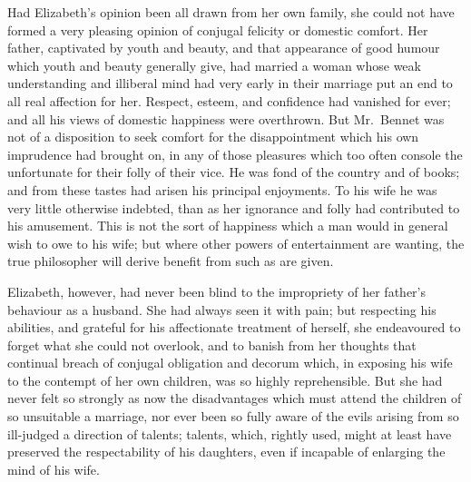 \documentclass[12pt,english]{book}
\begin{document}
Had Elizabeth's opinion been all drawn from her own family, she could
not have formed a very pleasing opinion of conjugal felicity or domestic
comfort. Her father, captivated by youth and beauty, and that appearance
of good humour which youth and beauty generally give, had married
a woman whose weak understanding and illiberal mind had very early
in their marriage put an end to all real affection for her. Respect,
esteem, and confidence had vanished for ever; and all his views of
domestic happiness were overthrown. But Mr.\ Bennet was not of a
disposition to seek comfort for the disappointment which his own imprudence
had brought on, in any of those pleasures which too often console
the unfortunate for their folly of their vice. He was fond of the
country and of books; and from these tastes had arisen his principal
enjoyments. To his wife he was very little otherwise indebted, than
as her ignorance and folly had contributed to his amusement. This
is not the sort of happiness which a man would in general wish to
owe to his wife; but where other powers of entertainment are wanting,
the true philosopher will derive benefit from such as are given.

Elizabeth, however, had never been blind to the impropriety of her
father's behaviour as a husband. She had always seen it with pain;
but respecting his abilities, and grateful for his affectionate treatment
of herself, she endeavoured to forget what she could not overlook,
and to banish from her thoughts that continual breach of conjugal
obligation and decorum which, in exposing his wife to the contempt
of her own children, was so highly reprehensible. But she had never
felt so strongly as now the disadvantages which must attend the children
of so unsuitable a marriage, nor ever been so fully aware of the evils
arising from so ill-judged a direction of talents; talents, which,
rightly used, might at least have preserved the respectability of
his daughters, even if incapable of enlarging the mind of his wife.
\end{document}

